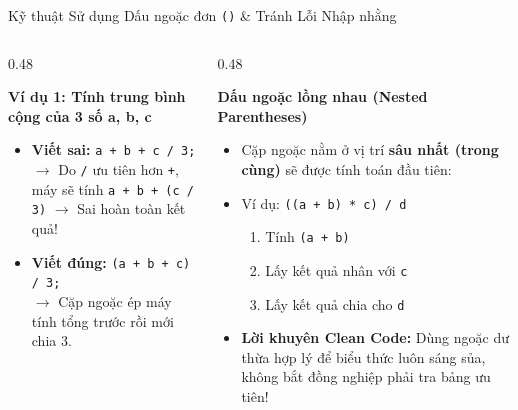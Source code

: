 \documentclass[aspectratio=169, 10pt]{beamer}
\begin{document}
\begin{frame}{Kỹ thuật Sử dụng Dấu ngoặc đơn \texttt{()} \& Tránh Lỗi Nhập nhằng}
  \begin{columns}[T]
    \begin{column}{0.48\textwidth}
      \begin{alertblock}{\textbf{Ví dụ 1: Tính trung bình cộng của 3 số a, b, c}}
        \begin{itemize}\small
          \item \textbf{Viết sai:} \texttt{a + b + c / 3;}\\
          $\to$ Do \texttt{/} ưu tiên hơn \texttt{+}, máy sẽ tính \texttt{a + b + (c / 3)} $\to$ Sai hoàn toàn kết quả!
          \item \textbf{Viết đúng:} \texttt{(a + b + c) / 3;}\\
          $\to$ Cặp ngoặc ép máy tính tổng trước rồi mới chia 3.
        \end{itemize}
      \end{alertblock}
    \end{column}

    \begin{column}{0.48\textwidth}
      \begin{exampleblock}{\textbf{Dấu ngoặc lồng nhau (Nested Parentheses)}}
        \begin{itemize}\small
          \item Cặp ngoặc nằm ở vị trí \textbf{sâu nhất (trong cùng)} sẽ được tính toán đầu tiên:
          \item Ví dụ: \texttt{((a + b) * c) / d}
            \begin{enumerate}\scriptsize
              \item Tính \texttt{(a + b)}
              \item Lấy kết quả nhân với \texttt{c}
              \item Lấy kết quả chia cho \texttt{d}
            \end{enumerate}
          \item \textbf{Lời khuyên Clean Code:} Dùng ngoặc dư thừa hợp lý để biểu thức luôn sáng sủa, không bắt đồng nghiệp phải tra bảng ưu tiên!
        \end{itemize}
      \end{exampleblock}
    \end{column}
  \end{columns}
\end{frame}
\end{document}
